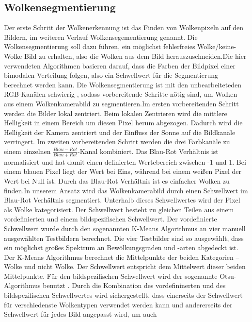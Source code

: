\documentclass[a4paper,11pt,twoside,german]{article}
\newcommand{\absatz}{\smallbreak}
\begin{document}
\subsection{Wolkensegmentierung} 
Der erste Schritt der Wolkenerkennung ist das Finden von Wolkenpixeln auf den
Bildern, im weiteren Verlauf Wolkensegementierung genannt. Die
Wolkensegmentierung soll dazu führen, ein möglichst fehlerfreies
Wolke/keine-Wolke Bild zu erhalten, also die Wolken aus dem Bild
herauszuschneiden.\absatz Die hier verwendeten Algorithmen basieren darauf, dass
die Farben der Bildpixel einer bimodalen Verteilung folgen, also ein Schwellwert
für die Segmentierung berechnet werden kann.  Die Wolkensegmentierung ist mit
den unbearbeiteteden RGB-Kanälen schwierig \citep{dev_14_color}, sodass
vorbereitende Schritte nötig sind, um Wolken aus einem Wolkenkamerabild zu
segmentieren.\absatz Im ersten vorbereitenden Schritt werden die Bilder lokal
zentriert. Beim lokalen Zentrieren wird die mittlere Helligkeit in einem Bereich
um diesen Pixel herum abgezogen. Dadurch wird die Helligkeit der Kamera
zentriert und der Einfluss der Sonne auf die Bildkanäle verringert. Im zweiten
vorbereitenden Schritt werden die drei Farbkanäle zu einem einzelnen
$\frac{Blau-Rot}{Blau+Rot}$-Kanal kombiniert. Das Blau-Rot Verhältnis ist
normalisiert und hat damit einen definierten Wertebereich zwischen -1 und 1. Bei
einem blauen Pixel liegt der Wert bei Eins, während bei einem weißen Pixel der
Wert bei Null ist. Durch das Blau-Rot Verhältnis ist es einfacher Wolken zu
finden.\absatz In unserem Ansatz wird das Wolkenkamerabild durch einen
Schwellwert im Blau-Rot Verhältnis segmentiert. Unterhalb dieses Schwellwertes
wird der Pixel als Wolke kategorisiert. Der Schwellwert besteht zu gleichen
Teilen aus einem vordefinierten und einem bildspezifischen Schwellwert.  Der
vordefinierte Schwellwert wurde durch den sogenannten K-Means Algorithmus
\citep{james_13_introduction} an vier manuell ausgewählten Testbildern
berechnet. Die vier Testbilder sind so ausgewählt, dass ein möglichst großes
Spektrum an Bewölkungsgraden und -arten abgedeckt ist. Der K-Means Algorithmus
berechnet die Mittelpunkte der beiden Kategorien – Wolke und nicht Wolke. Der
Schwellwert entspricht dem Mittelwert dieser beiden Mittelpunkte. Für den
bildspezifischen Schwellwert wird der sogenannte Otsu-Algorithmus benutzt
\citep{otsu_75_threshold}. Durch die Kombination des vordefininerten und des
bildspezifischen Schwellwertes wird sichergestellt, dass einerseits der
Schwellwert für verschiedenste Wolkentypen verwendet werden kann und
andererseits der Schwellwert für jedes Bild angepasst wird, um auch
\end{document}
